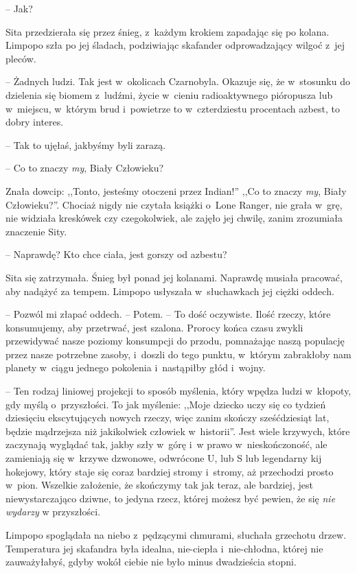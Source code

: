 \documentclass[oneside,polish,11pt,sfheadings]{mwbk}
\begin{document}
-- Jak?

Sita przedzierała się przez śnieg, z~każdym krokiem zapadając się po
kolana. Limpopo szła po jej śladach, podziwiając skafander
odprowadzający wilgoć z~jej pleców.

-- Żadnych ludzi. Tak jest w~okolicach Czarnobyla. Okazuje się, że w~stosunku do dzielenia się biomem z~ludźmi, życie w~cieniu radioaktywnego
pióropusza lub w~miejscu, w~którym brud i~powietrze to w~czterdziestu
procentach azbest, to dobry interes.

-- Tak to ujęłaś, jakbyśmy byli zarazą.

-- Co to znaczy \textit{my}, Biały Człowieku?

Znała dowcip: ,,Tonto, jesteśmy otoczeni przez Indian!'' ,,Co to znaczy
\textit{my}, Biały Człowieku?''. Chociaż nigdy nie czytała książki o~Lone
Ranger, nie grała w~grę, nie widziała kreskówek czy czegokolwiek, ale
zajęło jej chwilę, zanim zrozumiała znaczenie Sity.

-- Naprawdę? Kto chce ciała, jest gorszy od azbestu?

Sita się zatrzymała. Śnieg był ponad jej kolanami. Naprawdę musiała
pracować, aby nadążyć za tempem. Limpopo usłyszała w~słuchawkach jej
ciężki oddech. 

-- Pozwól mi złapać oddech. -- Potem. -- To dość oczywiste. Ilość rzeczy, które konsumujemy, aby przetrwać, jest szalona. Prorocy
końca czasu zwykli przewidywać nasze poziomy konsumpcji do przodu,
pomnażając naszą populację przez nasze potrzebne zasoby, i~doszli do
tego punktu, w~którym zabrakłoby nam planety w~ciągu jednego pokolenia i~nastąpiłby głód i~wojny.

-- Ten rodzaj liniowej projekcji to sposób myślenia, który wpędza ludzi w~kłopoty, gdy myślą o~przyszłości. To jak myślenie: ,,Moje dziecko uczy
się co tydzień dziesięciu ekscytujących nowych rzeczy, więc zanim
skończy sześćdziesiąt lat, będzie mądrzejsza niż jakikolwiek człowiek w~historii''. Jest wiele krzywych, które zaczynają wyglądać tak, jakby
szły w~górę i~w prawo w~nieskończoność, ale zamieniają się w~krzywe
dzwonowe, odwrócone U, lub S lub legendarny kij hokejowy, który staje
się coraz bardziej stromy i~stromy, aż przechodzi prosto w~pion.
Wszelkie założenie, że skończymy tak jak teraz, ale bardziej, jest
niewystarczająco dziwne, to jedyna rzecz, której możesz być pewien, że
się \textit{nie wydarzy }w przyszłości.

Limpopo spoglądała na niebo z~pędzącymi chmurami, słuchała grzechotu
drzew. Temperatura jej skafandra była idealna, nie-ciepła i~nie-chłodna,
której nie zauważyłabyś, gdyby wokół ciebie nie było minus dwadzieścia
stopni. 
\end{document}
